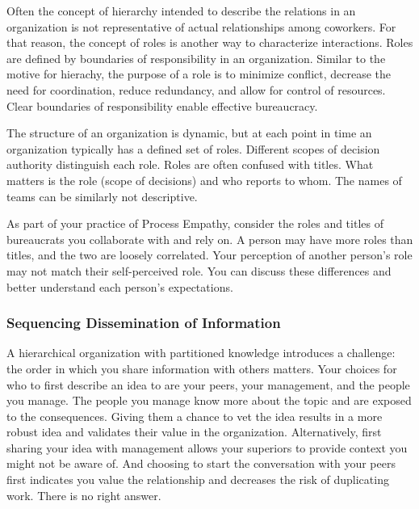 
Often the concept of hierarchy intended to describe the relations in an organization is not representative of actual relationships among coworkers. For that reason, the concept of roles is another way to characterize interactions. Roles are defined by boundaries of responsibility in an organization. Similar to the motive for hierachy, the purpose of a role is to minimize conflict, decrease the need for coordination, reduce redundancy, and allow for control of resources. Clear boundaries of responsibility  enable effective bureaucracy. 

The structure of an organization is dynamic, but at each point in time an organization typically has a defined set of roles. Different scopes of decision authority distinguish each role. 
Roles are often confused with titles. What matters is the role (scope of decisions) and who reports to whom. The names of teams can be similarly not descriptive.

As part of your practice of Process Empathy, consider the roles and titles of bureaucrats you collaborate with and rely on. A person may have more roles than titles, and the two are loosely correlated. Your perception of another person's role may not match their self-perceived role. You can discuss these differences and better understand each person's expectations. 


\subsubsection*{Sequencing Dissemination of Information}

A hierarchical organization with partitioned knowledge introduces a challenge: the order in which you share information with others matters. Your choices for who to first describe an idea to are your peers, your management, and the people you manage. 
% 
%
The people you manage know more about the topic and are exposed to the consequences. Giving them a chance to vet the idea results in a more robust idea and validates their value in the organization. Alternatively, first sharing your idea with management  allows your superiors to provide context you might not be aware of. And choosing to  start the conversation with your peers first indicates you value the relationship and decreases the risk of duplicating work. There is no right answer. 


